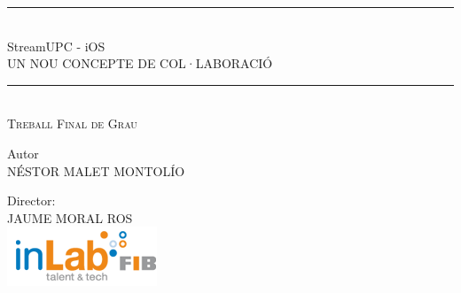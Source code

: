 \begin{titlepage}
\begin{center}
    \vspace*{\baselineskip}
    \rule{\textwidth}{0.4pt}\\[\baselineskip]
    {\LARGE StreamUPC - iOS\\[0.5\baselineskip] UN NOU CONCEPTE DE COL·LABORACIÓ}\\[0.5\baselineskip]
    \rule{\textwidth}{0.4pt}\vspace*{-\baselineskip}\vspace{3.2pt}\\[\baselineskip]
    \vspace*{\baselineskip}
    \scshape
    {\LARGE Treball Final de Grau }\par
    \vspace*{2\baselineskip}
    {\large Autor}                                                      \\[\baselineskip]
    {\large NÉSTOR MALET MONTOLÍO}                                       \\[5\baselineskip]
    \begin{minipage}{0.30\textwidth}
        \begin{flushleft}
            Director:                                                   \\[0.9\baselineskip]
            JAUME MORAL ROS                                             \\[0.8\baselineskip]
            \includegraphics[scale=0.4]{NotDef/logo_inlab.png}          \\


\end{flushleft}
\end{minipage}
\end{center}
\end{titlepage}
